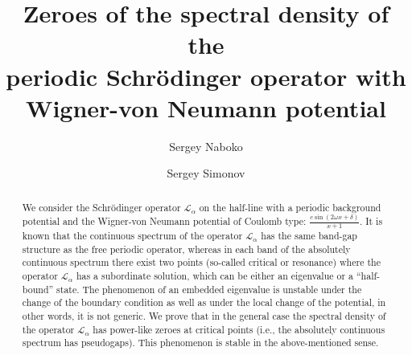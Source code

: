 \documentclass[a4paper,oneside,12pt]{amsart}
\begin{document}
\title[Zeroes of the spectral density]
{Zeroes of the spectral density of the
\\
periodic Schr\"odinger operator with
\\
Wigner-von Neumann potential}
\author{Sergey Naboko}
    \address{Department of Mathematical Physics, Institute of Physics, St. Petersburg University, Ulianovskaia 1, St. Petergoff, St. Petersburg, Russia, 198904}
\author{Sergey Simonov}
    \address{Chebyshev Laboratory, Department of Mathematics and Mechanics,
    Saint-Petersburg State University
    14th Line, 29b, Saint-Petersburg, 199178 Russia}
\date{}

\begin{abstract}
We consider the Schr\"odinger operator $\mathcal L_{\alpha}$ on
the half-line with a periodic background potential and the
Wigner-von Neumann potential of Coulomb type: \linebreak
$\frac{c\sin(2\omega x+\delta)}{x+1}$. It is known that the
continuous spectrum of the operator $\mathcal L_{\alpha}$ has the
same band-gap structure as the free periodic operator, whereas in
each band of the absolutely continuous spectrum there exist two
points (so-called critical or resonance) where the operator
$\mathcal L_{\alpha}$ has a subordinate solution, which can be
either an eigenvalue or a ``half-bound'' state. The phenomenon of
an embedded eigenvalue is unstable under the change of the
boundary condition as well as under the local change of the
potential, in other words, it is not generic. We prove that in the
general case the spectral density of the operator $\mathcal
L_{\alpha}$ has power-like zeroes at critical points (i.e., the
absolutely continuous spectrum has pseudogaps). This phenomenon is
stable in the above-mentioned sense.
\end{abstract}

\maketitle
\end{document}
